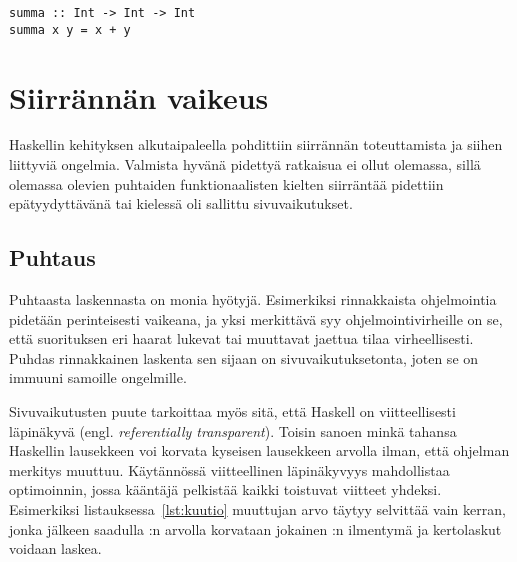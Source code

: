 \documentclass[finnish]{tktltiki2}
\begin{document}
\begin{lstlisting}[float,label={lst:esittely},caption={Syntaksin esittely}]
summa :: Int -> Int -> Int
summa x y = x + y
\end{lstlisting}


\section{Siirrännän vaikeus}



Haskellin kehityksen alkutaipaleella pohdittiin siirrännän toteuttamista ja siihen liittyviä
ongelmia. Valmista hyvänä pidettyä ratkaisua ei ollut olemassa, sillä olemassa olevien puhtaiden
funktionaalisten kielten siirräntää pidettiin epätyydyttävänä tai kielessä oli sallittu
sivuvaikutukset.

\subsection{Puhtaus}

Puhtaasta laskennasta on monia hyötyjä.  Esimerkiksi rinnakkaista
ohjelmointia pidetään perinteisesti vaikeana, ja yksi merkittävä syy ohjelmointivirheille on se,
että suorituksen eri haarat lukevat tai muuttavat jaettua tilaa virheellisesti. Puhdas rinnakkainen
laskenta sen sijaan on sivuvaikutuksetonta, joten se on immuuni samoille ongelmille.


Sivuvaikutusten puute tarkoittaa myös sitä, että Haskell on viitteellisesti läpinäkyvä (engl.
\emph{referentially transparent}). Toisin sanoen minkä tahansa Haskellin lausekkeen voi korvata
kyseisen lausekkeen arvolla ilman, että ohjelman merkitys muuttuu. Käytännössä viitteellinen
läpinäkyvyys mahdollistaa optimoinnin, jossa kääntäjä pelkistää kaikki toistuvat viitteet yhdeksi.
Esimerkiksi listauksessa~\ref{lst:kuutio} muuttujan  arvo täytyy selvittää vain kerran,
jonka jälkeen saadulla :n arvolla korvataan jokainen :n ilmentymä ja kertolaskut
voidaan laskea.
\end{document}
